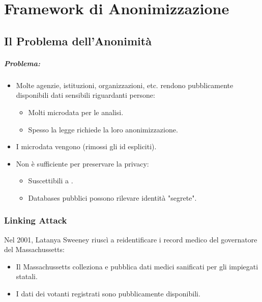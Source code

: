 \chapter{Framework di Anonimizzazione}


\section{Il Problema dell'Anonimità}

\paragraph{Problema:}

\begin{itemize}
  \item Molte agenzie, istituzioni, organizzazioni, etc. rendono pubblicamente disponibili dati sensibili riguardanti persone: 
    \begin{itemize}
      \item Molti microdata per le analisi. 
      \item Spesso la legge richiede la loro anonimizzazione.
    \end{itemize}
  \item I microdata vengono  (rimossi gli id espliciti). 
  \item Non è sufficiente per preservare la privacy:
    \begin{itemize}
      \item Suscettibili a . 
      \item Databases pubblici possono rilevare identità "segrete".
    \end{itemize}
\end{itemize}

\subsection{Linking Attack}

Nel 2001, Latanya Sweeney riuscì a reidentificare i record medico del governatore del Massachussetts: 
\begin{itemize}
  \item Il Massachussetts colleziona e pubblica dati medici sanificati per gli impiegati statali. 
  \item I dati dei votanti registrati sono pubblicamente disponibili.
\end{itemize}

